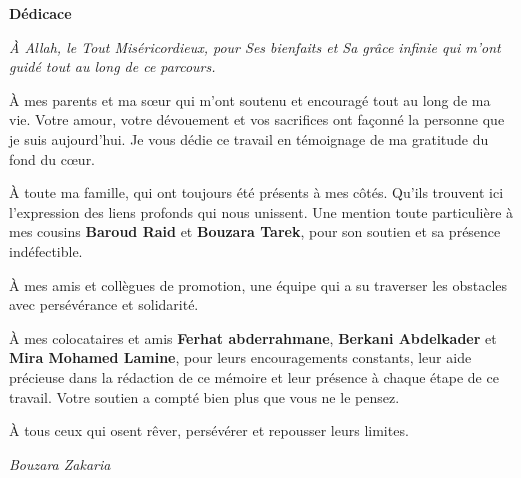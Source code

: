 \newpage
\begin{titlepage}
\thispagestyle{empty}
\centering

\textbf{\Huge{\textcolor{bleu}{Dédicace}}}\\[2em]

\begin{center}
\itshape
À Allah, le Tout Miséricordieux, pour Ses bienfaits et Sa grâce infinie qui m'ont guidé tout au long de ce parcours.

\bigskip

À mes parents et ma sœur qui m'ont soutenu et encouragé tout au long de ma vie. Votre amour, votre dévouement et vos sacrifices ont façonné la personne que je suis aujourd'hui. Je vous dédie ce travail en témoignage de ma gratitude du fond du cœur.

\bigskip

À toute ma famille, qui ont toujours été présents à mes côtés. Qu'ils trouvent ici l'expression des liens profonds qui nous unissent. Une mention toute particulière à mes cousins \textbf{Baroud Raid} et \textbf{Bouzara Tarek}, pour son soutien et sa présence indéfectible.

\bigskip

À mes amis et collègues de promotion, une équipe qui a su traverser les obstacles avec persévérance et solidarité.

\bigskip

À mes colocataires et amis \textbf{Ferhat abderrahmane}, \textbf{Berkani Abdelkader} et \textbf{Mira Mohamed Lamine}, pour leurs encouragements constants, leur aide précieuse dans la rédaction de ce mémoire et leur présence à chaque étape de ce travail. Votre soutien a compté bien plus que vous ne le pensez.

\bigskip

À tous ceux qui osent rêver, persévérer et repousser leurs limites.
\end{center}

\vfill
\raggedleft\textit{Bouzara Zakaria}

\end{titlepage}

